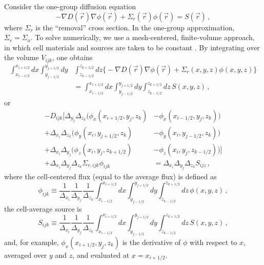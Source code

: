 Consider the one-group diffusion equation
\begin{equation}
  -\nabla D(\vec{r}) \nabla \phi(\vec{r}) + \Sigma_r(\vec{r})\phi(\vec{r})
    = S(\vec{r}) \, ,
\label{eq:1gdiff}
\end{equation}
where $\Sigma_r$ is the ``removal'' cross section.  In the one-group
approximation, $\Sigma_r = \Sigma_a$.
To solve  numerically, we use 
a mesh-centered, finite-volume approach, 
in which cell materials and sources are taken to be 
constant \cite{hebert2009arp}. 
By integrating  over the volume $V_{ijk}$, one obtains
\begin{equation}
\begin{split}
 \int^{x_{i+1/2}}_{x_{i-1/2}} dx 
   \int^{y_{j+1/2}}_{y_{j-1/2}} dy 
     & \int^{z_{k+1/2}}_{z_{k-1/2}} dz 
    \Bigg \{ -\nabla D(\vec{r}) \nabla \phi(\vec{r})  
              + \Sigma_r(x,y,z) \phi(x,y,z) \Bigg \} \\
       &= \int^{x_{i+1/2}}_{x_{i-1/2}} dx 
            \int^{y_{j+1/2}}_{y_{j-1/2}} dy 
              \int^{z_{k+1/2}}_{z_{k-1/2}} dz \, S(x,y,z)  \, ,
\end{split}
\end{equation}
or
\begin{equation}
\begin{split}
 -D_{ijk} \Bigg [ \Delta_{y_j}  \Delta_{z_k} 
                   \Big (\phi_x(x_{i+1/2},y_j,z_k) &- \phi_x(x_{i-1/2},y_j,z_k) \Big ) \\
                 + \Delta_{x_i} \Delta_{z_k} 
                   \Big (\phi_y(x_i,y_{j+1/2},z_k) &- \phi_y(x_i,y_{j-1/2},z_k) \Big ) \\
                 + \Delta_{x_i}  \Delta_{y_j} 
                   \Big (\phi_z(x_i, y_j, z_{k+1/2}) &- \phi_z(x_i, y_j, z_{k-1/2}) \Big ) 
          \Bigg ] \\
     + \Delta_{x_i} \Delta_{y_j} \Delta_{z_k}  \Sigma_{r,ijk} \phi_{ijk} 
      &= \Delta_{x_i} \Delta_{y_j} \Delta_{z_k} S_{ijz} \, ,
\end{split}
\label{eq:integrateddiffeq}
\end{equation}
where the cell-centered flux (equal to the average flux) is defined as
\begin{equation}
 \phi_{ijk} \equiv 
   \frac{1}{\Delta_{x_i}}\frac{1}{\Delta_{y_j}}\frac{1}{\Delta_{z_k}} 
     \int^{x_{i+1/2}}_{x_{i-1/2}} dx 
     \int^{y_{j+1/2}}_{y_{j-1/2}} dy 
     \int^{z_{k+1/2}}_{z_{k-1/2}} dz \, \phi(x,y,z) \, ,
\end{equation}
the cell-average source is
\begin{equation}
 S_{ijk} \equiv 
   \frac{1}{\Delta_{x_i}}\frac{1}{\Delta_{y_j}}\frac{1}{\Delta_{z_k}} 
     \int^{x_{i+1/2}}_{x_{i-1/2}} dx 
     \int^{y_{j+1/2}}_{y_{j-1/2}} dy 
     \int^{z_{k+1/2}}_{z_{k-1/2}} dz \, S(x,y,z) \, ,
\end{equation}
and, for example, $\phi_x(x_{i+1/2},y_j,z_k)$ is the derivative of $\phi$ with 
respect to $x$, averaged over $y$ and $z$, and evaluated at $x=x_{i+1/2}$.

